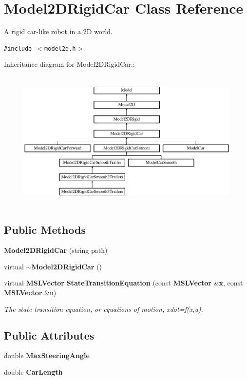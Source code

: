 \section{Model2DRigid\-Car  Class Reference}
\label{classModel2DRigidCar}
A rigid car-like robot in a 2D world. 


{\tt \#include $<$model2d.h$>$}

Inheritance diagram for Model2DRigid\-Car::\begin{figure}[H]
\begin{center}
\leavevmode
\includegraphics[height=7.07741cm]{classModel2DRigidCar}
\end{center}
\end{figure}
\subsection*{Public Methods}
\begin{CompactItemize}
\item 
{\bf Model2DRigid\-Car} (string path)
\item 
virtual {\bf $\sim$Model2DRigid\-Car} ()
\item 
virtual {\bf MSLVector} {\bf State\-Transition\-Equation} (const {\bf MSLVector} \&{\bf x}, const {\bf MSLVector} \&u)
\begin{CompactList}\small\item\em The state transition equation, or equations of motion, xdot=f(x,u).\item\end{CompactList}\end{CompactItemize}
\subsection*{Public Attributes}
\begin{CompactItemize}
\item 
double {\bf Max\-Steering\-Angle}
\item 
double {\bf Car\-Length}
\end{CompactItemize}


